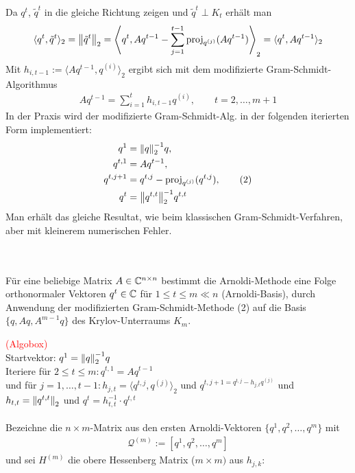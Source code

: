 Da $q^t$, $\tilde{q}^t$ in die gleiche Richtung zeigen und $\tilde{q}^t\perp K_t$ erhält man 
\begin{align*}\langle q^t, \tilde{q}^t\rangle_2 = \vertn{2}{\tilde{q}^t}_2 = 
\left\langle q^t,Aq^{t-1} - \sum_{j=1}^{t-1} \text{proj}_{q^{(j)}}(Aq^{t-1})\right\rangle_2 = \langle q^t, Aq^{t-1}\rangle_2\end{align*}
Mit $h_{i,t-1} := \langle Aq^{t-1},q^{(i)} \rangle_2$ ergibt sich mit dem modifizierte Gram-Schmidt-Algorithmus
\begin{align*}Aq^{t-1}=\sum_{i=1}^{t} h_{i,t-1 }q^{(i)}, \qquad t=2,\dots,m+1\end{align*}
In der Praxis wird der modifizierte Gram-Schmidt-Alg. in der folgenden iterierten Form implementiert:
\begin{align*}
  q^1 &= \vertn{2}{q}_2^{-1}q, \\
  q^{t,1}&=Aq^{t-1}, \\
  q^{t,j+1}&=q^{t,j}-\text{proj}_{q^{(j)}}(q^{t,j}), \tag{2}\\
  q^t&=\vertn{2}{q^{t,t}}_2^{-1}q^{t,t}
\end{align*}
Man erhält das gleiche Resultat, wie beim klassischen Gram-Schmidt-Verfahren, aber mit kleinerem numerischen Fehler. \\ \\
\begin{defbox} \ \\
  Für eine beliebige Matrix $A\in\mathbb C  ^{n\times n}$ bestimmt die Arnoldi-Methode eine Folge orthonormaler 
  Vektoren $q^t\in\mathbb C  $ für $1\leq t \leq m \ll n$ (Arnoldi-Basis), durch Anwendung der modifizierten 
  Gram-Schmidt-Methode (2) auf die Basis $\{q,Aq,A^{m-1}q\}$ des Krylov-Unterraums $K_m$.
\end{defbox}
\textcolor{red}{(Algobox)} \\
Startvektor: $q^1=\vertn{2}{q}^{-1}_2 q$ \\
Iteriere für $2\leq t\leq m: q^{t,1}=Aq^{t-1}$ \\
und für $j=1,\dots,t-1: h_{j,t} = \langle q^{t,j},q^{(j)}\rangle_2$ und $q^{t,j+1=q^{t,j}-h_{j,t}q^{(j)}}$ und $h_{t,t}=\vertn{2}{q^{t,t}}_2$ 
und $q^t = h_{t,t}^{-1}\cdot q^{t,t}$ \\ \\
Bezeichne die $n\times m$-Matrix aus den ersten Arnoldi-Vektoren $\{q^1,q^2,\dots,q^m\}$ mit 
\begin{align*}\mathcal{Q}^{(m)}:=[q^1,q^2,\dots,q^m]\end{align*} und sei $H^{(m)}$ die obere Hessenberg Matrix ($m\times m)$ aus $h_{j,k}$:
